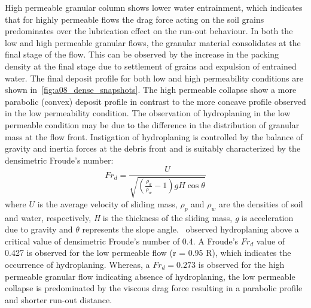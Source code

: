 High permeable granular column shows lower water entrainment, which indicates 
that for highly permeable flows the drag force acting on the soil grains 
predominates over the lubrication effect on the run-out behaviour. In both the 
low and high permeable granular flows, the granular material consolidates at 
the final stage of the flow. This can be observed by the increase in the 
packing density at the final stage due to settlement of grains and expulsion of 
entrained water. The final deposit profile for both low and high permeability 
conditions are shown in~\cref{fig:a08_dense_snapshots}. The high permeable 
collapse show a more parabolic (convex) deposit profile in contrast to the more 
concave profile observed in the low permeability condition. The observation of 
hydroplaning in the low permeable condition may be due to the difference in the 
distribution of granular mass at the flow front. Instigation of hydroplaning is 
controlled by the balance of gravity and inertia forces at the debris front and 
is suitably characterized by the densimetric Froude's number:
%
\begin{equation}
Fr_d = \frac{U}{\sqrt{(\frac{\rho_d}{\rho_w}-1)gH\cos\theta}}
\end{equation}
where $U$ is the average velocity of sliding mass, $\rho_p$ and $\rho_w$ are 
the densities of soil and water, respectively, \textit{H} is the thickness of 
the sliding mass, \textit{g} is acceleration due to gravity and $\theta$ 
represents the slope angle.~\citet{Harbitz2003} observed 
hydroplaning above a critical value of densimetric Froude's number of 0.4. A 
Froude's $Fr_d$ value of 0.427 is observed for the low permeable flow (r = 0.95 
R), which indicates the occurrence of hydroplaning. Whereas, a $Fr_d = 0.273$ 
is observed for the high permeable granular flow indicating absence of 
hydroplaning, the low 
permeable collapse is predominated by the viscous drag force resulting in a 
parabolic profile and shorter run-out distance. 
